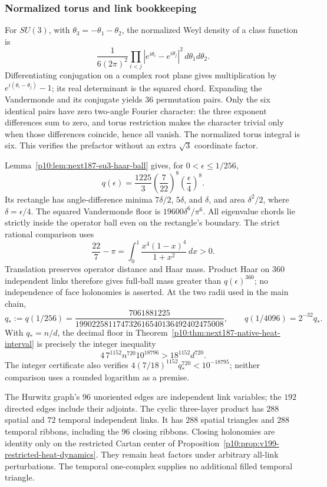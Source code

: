 \documentclass[12pt,a4paper]{article}
\begin{document}
\subsubsection{Normalized torus and link bookkeeping}
For $SU(3)$, with $\theta_3=-\theta_1-\theta_2$, the normalized Weyl density
of a class function is
\[
 \frac1{6(2\pi)^2}
 \prod_{i<j}|e^{i\theta_i}-e^{i\theta_j}|^2\,d\theta_1d\theta_2.
\]
Differentiating conjugation on a complex root plane gives multiplication by
$e^{i(\theta_i-\theta_j)}-1$; its real determinant is the squared chord.
Expanding the Vandermonde and its conjugate yields $36$ permutation pairs.
Only the six identical pairs have zero two-angle Fourier character: the
three exponent differences sum to zero, and torus restriction makes the
character trivial only when those differences coincide, hence all vanish.
The normalized torus integral is six. This verifies the prefactor without
an extra $\sqrt3$ coordinate factor.

Lemma~\ref{p10:lem:next187-su3-haar-ball} gives, for
$0<\epsilon\le1/256$,
\[
 q(\epsilon)=\frac{1225}{3}\left(\frac7{22}\right)^8
                 \left(\frac\epsilon4\right)^8.
\]
Its rectangle has angle-difference minima $7\delta/2$, $5\delta$, and
$\delta$, and area $\delta^2/2$, where $\delta=\epsilon/4$.
The squared Vandermonde floor is $19600\delta^6/\pi^6$.
All eigenvalue chords lie strictly inside the operator ball even on the
rectangle's boundary. The strict rational comparison uses
\[
 \frac{22}{7}-\pi
 =\int_0^1\frac{x^4(1-x)^4}{1+x^2}\,dx>0.
\]
Translation preserves operator distance and Haar mass. Product Haar on
$360$ independent links therefore gives full-ball mass greater than
$q(\epsilon)^{360}$; no independence of face holonomies is asserted.
At the two radii used in the main chain,
\[
 q_*:=q(1/256)
  =\frac{7061881225}{199022581174732616540136492402475008},
 \qquad q(1/4096)=2^{-32}q_*.
\]
With $q_*=n/d$, the decimal floor in
Theorem~\ref{p10:thm:next187-native-heat-interval} is precisely the integer
inequality
\[
 4\,7^{1152}n^{720}10^{18796}>18^{1152}d^{720}.
\]
The integer certificate also verifies
$4(7/18)^{1152}q_*^{720}<10^{-18795}$; neither comparison uses a rounded
logarithm as a premise.

The Hurwitz graph's $96$ unoriented edges are independent link variables;
the $192$ directed edges include their adjoints. The cyclic three-layer
product has $288$ spatial and $72$ temporal independent links. It has
$288$ spatial triangles and $288$ temporal ribbons, including the $96$
closing ribbons. Closing holonomies are identity only on the restricted
Cartan center of Proposition~\ref{p10:prop:v199-restricted-heat-dynamics}.
They remain heat factors under arbitrary all-link perturbations. The
temporal one-complex supplies no additional filled temporal triangle.
\end{document}
